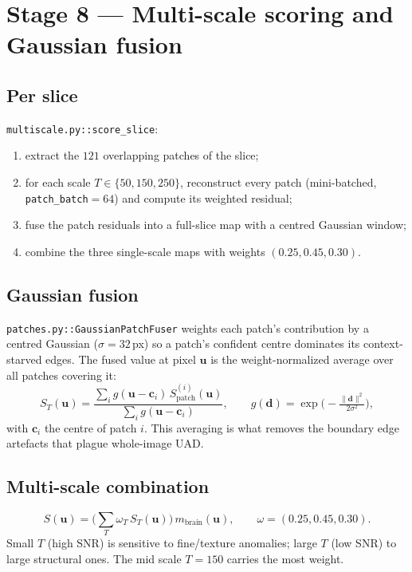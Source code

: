 \documentclass[11pt,a4paper]{article}
\newcommand{\code}[1]{\texttt{\small #1}}
\begin{document}
\section{Stage 8 — Multi-scale scoring and Gaussian fusion}

\subsection{Per slice}
\code{multiscale.py::score\_slice}:
\begin{enumerate}[leftmargin=1.5em,itemsep=1pt]
\item extract the $121$ overlapping patches of the slice;
\item for each scale $T\in\{50,150,250\}$, reconstruct every patch
(mini-batched, \code{patch\_batch}$=64$) and compute its weighted residual;
\item fuse the patch residuals into a full-slice map with a centred Gaussian
window;
\item combine the three single-scale maps with weights $(0.25,0.45,0.30)$.
\end{enumerate}

\subsection{Gaussian fusion}
\code{patches.py::GaussianPatchFuser} weights each patch's contribution by a
centred Gaussian ($\sigma=32$\,px) so a patch's confident centre dominates its
context-starved edges. The fused value at pixel $\bm u$ is the weight-normalized
average over all patches covering it:
\begin{equation}
S_T(\bm u)=\frac{\sum_i g(\bm u-\bm c_i)\,S^{(i)}_{\text{patch}}(\bm u)}
{\sum_i g(\bm u-\bm c_i)},
\qquad
g(\bm d)=\exp\!\Big(\!-\tfrac{\|\bm d\|^2}{2\sigma^2}\Big),
\end{equation}
with $\bm c_i$ the centre of patch $i$. This averaging is what removes the
boundary edge artefacts that plague whole-image UAD.

\subsection{Multi-scale combination}
\begin{equation}
\label{eq:multiscale}
S(\bm u)=\Big(\sum_{T}\omega_T\,S_T(\bm u)\Big)\,m_{\text{brain}}(\bm u),
\qquad \omega=(0.25,0.45,0.30).
\end{equation}
Small $T$ (high SNR) is sensitive to fine/texture anomalies; large $T$ (low SNR)
to large structural ones. The mid scale $T{=}150$ carries the most weight.
\end{document}
